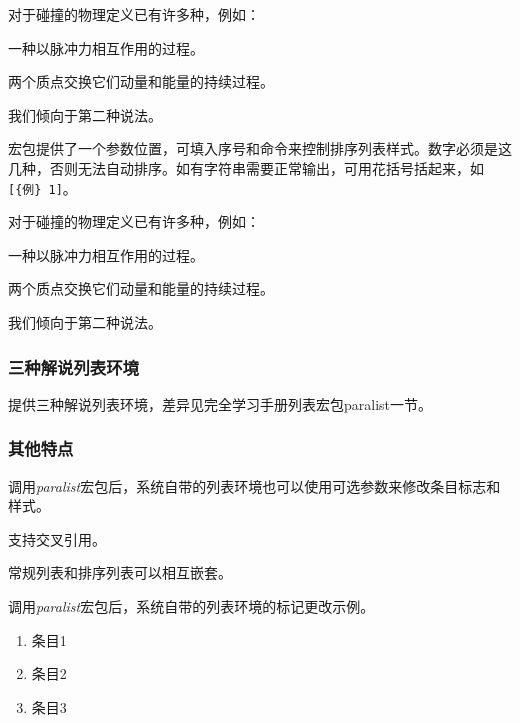 \begin{codeshow}
	对于碰撞的物理定义已有许多种，例如：
	\begin{asparaenum}[(1)]
		\item 一种以脉冲力相互作用的过程。
		\item 两个质点交换它们动量和能量的持续过程。
	\end{asparaenum}
	我们倾向于第二种说法。
\end{codeshow}

宏包提供了一个参数位置，可填入序号和命令来控制排序列表样式。数字必须是这几种，否则无法自动排序。如有字符串需要正常输出，可用花括号括起来，如\verb|[{例} 1]|。

\begin{codeshow}
	对于碰撞的物理定义已有许多种，例如：
	\begin{compactenum}[{定义} \itshape (1)]
		\item 一种以脉冲力相互作用的过程。
		\item 两个质点交换它们动量和能量的持续过程。
	\end{compactenum}
	我们倾向于第二种说法。
\end{codeshow}

\subsubsection{三种解说列表环境}
提供三种解说列表环境，差异见\LaTeXe 完全学习手册列表宏包paralist一节。

\subsubsection{其他特点}
\begin{asparaenum}[(1)]
	\item 调用\emph{paralist}宏包后，系统自带的列表环境也可以使用可选参数来修改条目标志和样式。
	\item 支持交叉引用。
	\item 常规列表和排序列表可以相互嵌套。
\end{asparaenum}

\begin{codeshow}
	调用\emph{paralist}宏包后，系统自带的列表环境的标记更改示例。
	\begin{enumerate}[(1)]
		\itemsep=0pt
		\parskip=0pt
		\item 条目1
		\item 条目2
		\item 条目3
		\end{enumerate}
\end{codeshow}

